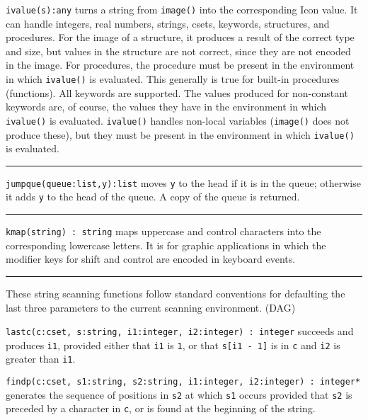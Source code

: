 \texttt{ivalue(s):any} turns a string from \texttt{image()} into the
corresponding Icon value. It can handle integers, real numbers,
strings, csets, keywords, structures, and procedures. For the image of
a structure, it produces a result of the correct type and size, but
values in the structure are not correct, since they are not encoded in
the image. For procedures, the procedure must be present in the
environment in which \texttt{ivalue()} is evaluated. This generally is
true for built-in procedures (functions). All keywords are supported.
The values produced for non-constant keywords are, of course, the
values they have in the environment in which \texttt{ivalue()} is
evaluated. \texttt{ivalue()} handles non-local variables
(\texttt{image()} does not produce these), but they must be present in
the environment in which \texttt{ivalue()} is evaluated. 

\vspace{0.25cm}\hrule{}

\texttt{jumpque(}\texttt{queue}\texttt{:list,y):list} moves
\texttt{y} to the head if it is in the queue; otherwise it adds
\texttt{y} to the head of the queue. A copy of the queue is returned.


\vspace{0.25cm}\hrule{}

\texttt{kmap(string) : string} maps uppercase and control
characters into the corresponding
lowercase letters. It is for graphic applications in which the modifier
keys for shift and control are encoded in keyboard
events. 

\vspace{0.25cm}\hrule{}

These string scanning functions follow standard conventions for
defaulting the last three parameters to the current scanning
environment. (DAG)

\texttt{lastc(c:cset, s:string, i1:integer, i2:integer) : integer}
succeeds and produces \texttt{i1}, provided either that \texttt{i1} is
\texttt{1}, or that \texttt{s[i1 - 1]} is in \texttt{c} and \texttt{i2}
is greater than \texttt{i1}.

\texttt{findp(c:cset, s1:string, s2:string, i1:integer, i2:integer) :
integer*} generates the sequence of positions in \texttt{s2} at which
\texttt{s1} occurs provided that \texttt{s2} is preceded by a character
in \texttt{c}, or is found at the beginning of the string.

